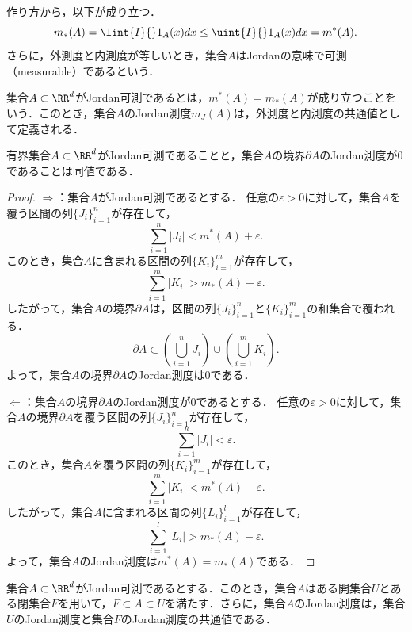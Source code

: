 作り方から，以下が成り立つ．
\[
m_*(A) = \lint{I}{} 1_A(x) dx \le \uint{I}{} 1_A(x) dx = m^*(A).
\]
さらに，外測度と内測度が等しいとき，集合$A$はJordanの意味で可測（measurable）であるという．
\begin{definition}[Jordan可測]
    集合$A \subset \RR^d$がJordan可測であるとは，$m^*(A) = m_*(A)$が成り立つことをいう．このとき，集合$A$のJordan測度$m_J(A)$は，外測度と内測度の共通値として定義される．
\end{definition}

\begin{theorem}[Jordan可測の判定法]
    有界集合$A \subset \RR^d$がJordan可測であることと，集合$A$の境界$\partial A$のJordan測度が0であることは同値である．
\end{theorem}
\begin{proof}
    $\Rightarrow$：集合$A$がJordan可測であるとする．
    任意の$\varepsilon > 0$に対して，集合$A$を覆う区間の列$\{J_i\}_{i=1}^n$が存在して，
    \[\sum_{i=1}^n |J_i| < m^*(A) + \varepsilon.\]
    このとき，集合$A$に含まれる区間の列$\{K_i\}_{i=1}^m$が存在して，
    \[\sum_{i=1}^m |K_i| > m_*(A) - \varepsilon.\]
    したがって，集合$A$の境界$\partial A$は，区間の列$\{J_i\}_{i=1}^n$と$\{K_i\}_{i=1}^m$の和集合で覆われる．
    \[\partial A \subset \left( \bigcup_{i=1}^n J_i \right) \cup \left( \bigcup_{i=1}^m K_i \right).\]
    よって，集合$A$の境界$\partial A$のJordan測度は0である．

    $\Leftarrow$：集合$A$の境界$\partial A$のJordan測度が0であるとする．
    任意の$\varepsilon > 0$に対して，集合$A$の境界$\partial A$を覆う区間の列$\{J_i\}_{i=1}^n$が存在して，
    \[\sum_{i=1}^n |J_i| < \varepsilon.\]
    このとき，集合$A$を覆う区間の列$\{K_i\}_{i=1}^m$が存在して，
    \[\sum_{i=1}^m |K_i| < m^*(A) + \varepsilon.\]
    したがって，集合$A$に含まれる区間の列$\{L_i\}_{i=1}^l$が存在して，
    \[\sum_{i=1}^l |L_i| > m_*(A) - \varepsilon.\]
    よって，集合$A$のJordan測度は$m^*(A) = m_*(A)$である．
\end{proof}

\begin{theorem}[Jordan可測集合の性質]
    集合$A \subset \RR^d$がJordan可測であるとする．このとき，集合$A$はある開集合$U$とある閉集合$F$を用いて，$F \subset A \subset U$を満たす．さらに，集合$A$のJordan測度は，集合$U$のJordan測度と集合$F$のJordan測度の共通値である．
\end{theorem}


